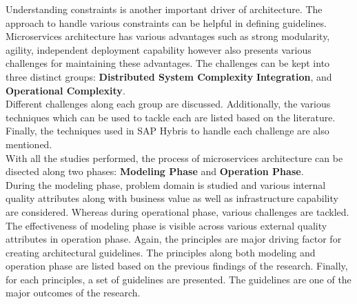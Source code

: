 Understanding constraints is another important driver of architecture. The approach to handle various constraints can be helpful in defining guidelines. Microservices architecture has various advantages such as strong modularity, agility, independent deployment capability however also presents various challenges for maintaining these advantages. The challenges can be kept into three distinct groups: 
\textbf{Distributed System Complexity}
\textbf{Integration}, and
\textbf{Operational Complexity}.\\
Different challenges along each group are discussed. Additionally, the various techniques which can be used to tackle each  are listed based on the literature. Finally, the techniques used in SAP Hybris to handle each challenge are also mentioned.\\
With all the studies performed, the process of microservices architecture can be disected along two phases:
\textbf{Modeling Phase} and 
\textbf{Operation Phase}.\\
During the modeling phase, problem domain is studied and various internal quality attributes along with business value as well as infrastructure capability are considered. Whereas during operational phase, various challenges are tackled. The effectiveness of modeling phase is visible across various external quality attributes in operation phase. Again, the principles are major driving factor for creating architectural guidelines. The principles along both modeling and operation phase are listed based on the previous findings of the research. Finally, for each principles, a set of guidelines are presented. The guidelines are one of the major outcomes of the research.
